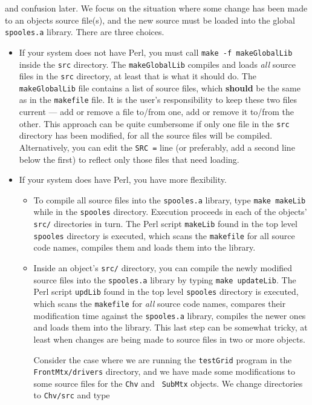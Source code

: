 and confusion later.
We focus on the situation where some change has been made to an
objects source file(s), and the new source must be loaded into the
global {\tt spooles.a} library.
There are three choices.
\begin{itemize}
\item
If your system does not have Perl, you must call
{\tt make -f makeGlobalLib} inside the {\tt src} directory.
The {\tt makeGlobalLib} compiles and loads {\it all} source files
in the {\tt src} directory, at least that is what it should do.
The {\tt makeGlobalLib} file contains a list of source files,
which {\bf should} be the same as in the {\tt makefile} file.
It is the user's responsibility to keep these two files current
--- add or remove a file to/from one, add or remove it to/from 
the other.
This approach can be quite cumbersome if only one file in the 
{\tt src} directory has been modified, for all the source files
will be compiled.
Alternatively, 
you can edit the {\tt SRC =} line (or preferably, add a second
line below the first) to reflect only those files that need loading.
\item
If your system does have Perl, you have more flexibility.
\begin{itemize}
\item
To compile all source files into the {\tt spooles.a} library, 
type {\tt make makeLib} while in the {\tt spooles} directory. 
Execution proceeds in each of the objects' {\tt src/} directories
in turn.
The Perl script {\tt makeLib}
found in the top level {\tt spooles} directory is executed,
which scans the {\tt makefile} for all source code names,
compiles them and loads them into the library.
\item
Inside an object's {\tt src/} directory,
you can compile the newly modified source files 
into the {\tt spooles.a} 
library by typing {\tt make updateLib}. 
The Perl script {\tt updLib}
found in the top level {\tt spooles} directory is executed,
which scans the {\tt makefile} for {\it all} source code names,
compares their modification time against the {\tt spooles.a}
library, compiles the newer ones and loads them into the library.
This last step can be somewhat tricky, at least when changes are
being made to source files in two or more objects.
\par
Consider the case where we are running the {\tt testGrid} program
in the {\tt FrontMtx/drivers} directory, and we have made some
modifications to some source files for the {\tt Chv} and {\tt
SubMtx} objects.
We change directories to {\tt Chv/src} and type

\end{itemize}
\end{itemize}
